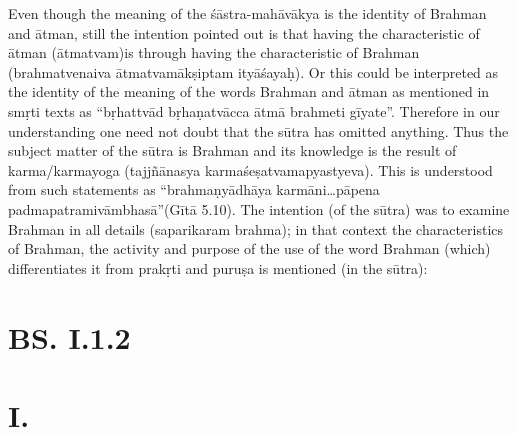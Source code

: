 Even though the meaning of the śāstra-mahāvākya is the identity of Brahman and ātman, still the intention pointed out is that having the  characteristic of ātman (ātmatvam)is through having the characteristic of Brahman (brahmatvenaiva ātmatvamākṣiptam ityāśayaḥ).  Or this could be interpreted as the identity of the meaning of the words Brahman and ātman as mentioned in smṛti texts as “bṛhattvād bṛhaṇat\-vācca ātmā brahmeti gīyate”. Therefore in our understanding one need not doubt that the sūtra has omitted anything. Thus the subject matter of the sūtra is Brahman and its knowledge is the result of karma/karma\-yoga (tajjñānasya karmaśeṣatvamapyastyeva). This is understood from such statements as “brahmaṇyādhāya karmāni…pāpena padmapatra\-mivāmbhasā”(Gītā 5.10). The intention (of the sūtra) was to examine Brahman in all details (saparikaram brahma); in that context the characteristics of Brahman, the activity and purpose of the use of the word Brahman (which) differentiates it from prakṛti and puruṣa is mentioned (in the sūtra):

\section*{BS. I.1.2}

\section*{ I.}


